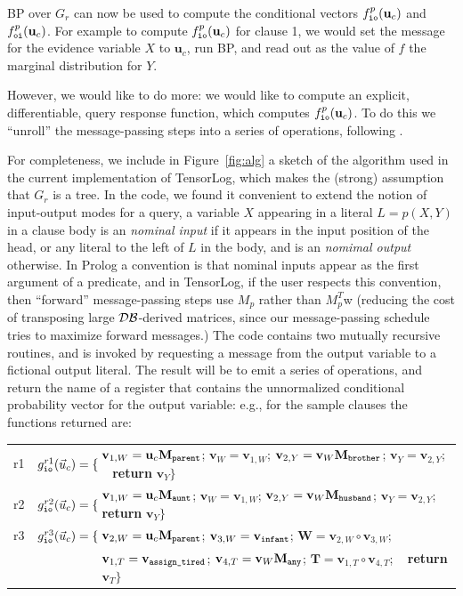 \documentclass{article}
\newcommand{\cd}[1]{{\small \texttt{#1}}}
\newcommand{\trm}[1]{\textit{#1}}
\newcommand{\vek}[1]{\textbf{#1}}
\newcommand{\M}{\textbf{M}}
\newcommand{\DB}{{\cal{DB}}}
\begin{document}
BP over $G_r$ can now be used to compute the conditional vectors
$f^p_\cd{io}(\vek{u}_c)$ and $f^p_\cd{oi}(\vek{u}_c)$.  For example to
compute $f^p_\cd{io}(\vek{u}_c)$ for clause 1, we would set the
message for the evidence variable $X$ to $\vek{u}_c$, run BP, and read
out as the value of $f$ the marginal distribution for $Y$.  

However, we would like to do more: we would like to compute an
explicit, differentiable, query response function, which computes
$f^p_\cd{io}(\vek{u}_c)$.  To do this we ``unroll'' the
message-passing steps into a series of operations, following
\cite{gormley_approximation-aware_2015}.

For completeness, we include in Figure~\ref{fig:alg} a sketch of the
algorithm used in the current implementation of TensorLog, which makes
the (strong) assumption that $G_r$ is a tree.
In the code, we found it convenient to extend the notion of
input-output modes for a query, a variable $X$ appearing in a literal
$L=p(X,Y)$ in a clause body is an \trm{nominal input} if it appears in
the input position of the head, or any literal to the left of $L$ in
the body, and is an \trm{nomimal output} otherwise.  In Prolog a
convention is that nominal inputs appear as the first argument of a
predicate, and in TensorLog, if the user respects this convention,
then ``forward'' message-passing steps use $M_p$ rather than $M_p^T$w
(reducing the cost of transposing large $\DB$-derived matrices, since
our message-passing schedule tries to maximize forward messages.)  The
code contains two mutually recursive routines, and is invoked by
requesting a message from the output variable to a fictional output
literal. The result will be to emit a series of operations, and return
the name of a register that contains the unnormalized conditional
probability vector for the output variable: e.g., for the sample clauses
the functions returned are:

\begin{small}
\begin{tabular}{lll} 
 r1 & $g^{r1}_\cd{io}(\vec{u}_c) = \{\!\!\!\!\!$ &
            $\vek{v}_{1,W} = \vek{u}_c \M_\cd{parent}$; $\vek{v}_W = \vek{v}_{1,W}$; $\vek{v}_{2,Y} = \vek{v}_W \M_\cd{brother}$; $\vek{v}_Y = \vek{v}_{2,Y}$;
            ~ \textbf{return} $\vek{v}_{Y} \}$ \\
 r2 & $g^{r2}_\cd{io}(\vec{u}_c) = \{\!\!\!\!\!$ &
            $\vek{v}_{1,W} = \vek{u}_c \M_\cd{aunt}$; $\vek{v}_W = \vek{v}_{1,W}$; $\vek{v}_{2,Y} = \vek{v}_W \M_\cd{husband}$; $\vek{v}_Y = \vek{v}_{2,Y}$;
            ~ \textbf{return} $\vek{v}_{Y} \}$ \\
 r3 & $g^{r3}_\cd{io}(\vec{u}_c) = \{\!\!\!\!\!$ &
            $\vek{v}_{2,W} = \vek{u}_c \M_\cd{parent}$; $\vek{v}_{3,W} = \vek{v}_\cd{infant}$; $\vek{W} = \vek{v}_{2,W} \circ \vek{v}_{3,W}$;\\
       & &  $\vek{v}_{1,T} = \vek{v}_\cd{assign\_tired}$; $\vek{v}_{4,T} = \vek{v}_{W} \M_\cd{any}$; $\vek{T} = \vek{v}_{1,T} \circ \vek{v}_{4,T}$; 
            ~ \textbf{return} $\vek{v}_{T} \}$ \\
\end{tabular}
\end{small}
\end{document}
